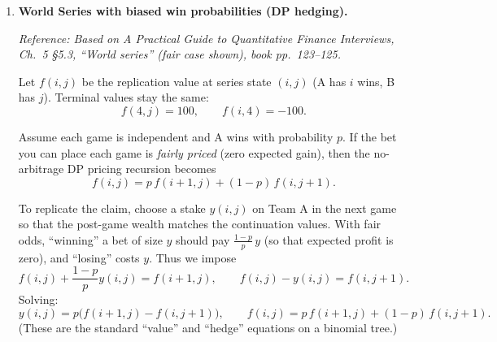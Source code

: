 \documentclass[11pt]{article}
\begin{document}
\begin{enumerate}[leftmargin=*, itemsep=1.0em]
A convenient state variable for current payoff is
\[
\text{(red drawn)}-\text{(black drawn)} = (26-r)-(26-b)=b-r.
\]
So, if you stop when the remaining deck is $(b,r)$, your payoff is $\boxed{b-r}$.

Let $V(b,r)$ be the optimal expected payoff from state $(b,r)$.
At $(b,r)$ you either stop (get $b-r$) or continue. If you continue:
\begin{itemize}
\item with probability $\frac{b}{b+r}$ you draw a black card, gain $-1$ and move to $(b-1,r)$,
\item with probability $\frac{r}{b+r}$ you draw a red card, gain $+1$ and move to $(b,r-1)$.
\end{itemize}
Because the payoff $b-r$ already tracks the accumulated score, the Bellman recursion can be written directly as in the book:
\[
\boxed{
V(b,r)=\max\!\left(
b-r,\ 
\frac{b}{b+r}\,V(b-1,r) + \frac{r}{b+r}\,V(b,r-1)
\right).
}
\]
Boundary conditions:
\[
V(0,r)=0,
\]
because, when only red cards remain, continuing to the end yields $0$ in the
$b-r$ convention. Also,
\[
V(b,0)=b.
\]

Running the recursion (or using the figure/table in the book) gives
\[
\boxed{V(26,26)\approx 2.62.}
\]
So a risk-neutral player should be willing to pay about \$2.62 to play, under optimal stopping.

\item \textbf{World Series with biased win probabilities (DP hedging).}

\textit{Reference: Based on A Practical Guide to Quantitative Finance Interviews, Ch.\ 5 \S5.3, ``World series'' (fair case shown), book pp.\ 123--125.}

\medskip
Let $f(i,j)$ be the replication value at series state $(i,j)$ (A has $i$ wins, B has $j$).
Terminal values stay the same:
\[
f(4,j)=100,\qquad f(i,4)=-100.
\]

Assume each game is independent and A wins with probability $p$.
If the bet you can place each game is \emph{fairly priced} (zero expected gain), then the no-arbitrage DP pricing recursion becomes
\[
\boxed{f(i,j)=p\,f(i+1,j)+(1-p)\,f(i,j+1).}
\]

To replicate the claim, choose a stake $y(i,j)$ on Team A in the next game so that the post-game wealth matches the continuation values.
With fair odds, ``winning'' a bet of size $y$ should pay $\frac{1-p}{p}\,y$ (so that expected profit is zero), and ``losing'' costs $y$.
Thus we impose
\[
f(i,j)+\frac{1-p}{p}y(i,j)=f(i+1,j),\qquad f(i,j)-y(i,j)=f(i,j+1).
\]
Solving:
\[
\boxed{
y(i,j)=p\bigl(f(i+1,j)-f(i,j+1)\bigr),
\qquad
f(i,j)=p\,f(i+1,j)+(1-p)\,f(i,j+1).
}
\]
(These are the standard ``value'' and ``hedge'' equations on a binomial tree.)

\end{enumerate}
\end{document}
